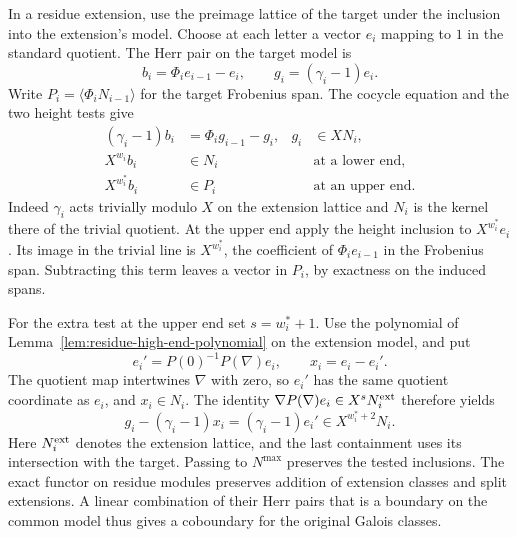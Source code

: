 In a residue extension, use the preimage lattice of the target
under the inclusion into the extension's model. Choose at each
letter a vector \(e_i\) mapping to \(1\) in the standard quotient.
The Herr pair on the target model is
\[
 b_i=\Phi_i e_{i-1}-e_i,\qquad g_i=(\gamma_i-1)e_i.
\]
Write \(P_i=\langle\Phi_i N_{i-1}\rangle\) for the target
Frobenius span. The cocycle equation and the two height tests
give
\[
 \begin{aligned}
 (\gamma_i-1)b_i&=\Phi_i g_{i-1}-g_i, &g_i&\in XN_i,\\
 X^{w_i}b_i&\in N_i &&\text{at a lower end},\\
 X^{w_i^*}b_i&\in P_i &&\text{at an upper end}.
 \end{aligned}
\]
Indeed \(\gamma_i\) acts trivially modulo \(X\) on the extension
lattice and \(N_i\) is the kernel there of the trivial quotient.
At the upper end apply the height inclusion to \(X^{w_i^*}e_i\).
Its image in the trivial line is \(X^{w_i^*}\), the coefficient
of \(\Phi_i e_{i-1}\) in the Frobenius span. Subtracting this
term leaves a vector in \(P_i\), by exactness on the induced
spans.

For the extra test at the upper end set \(s=w_i^*+1\).
Use the polynomial of Lemma~\ref{lem:residue-high-end-polynomial}
on the extension model, and put
\[
    e_i'=P(0)^{-1}P(\nabla)e_i,\qquad x_i=e_i-e_i'.
\]
The quotient map intertwines \(\nabla\) with zero, so \(e_i'\)
has the same quotient coordinate as \(e_i\), and \(x_i\in N_i\).
The identity \(\nabla P(\nabla)e_i\in X^s N_i^{\rm ext}\)
therefore yields
\[
     g_i-(\gamma_i-1)x_i=(\gamma_i-1)e_i'
                          \in X^{w_i^*+2}N_i .
\]
Here \(N_i^{\rm ext}\) denotes the extension lattice, and the
last containment uses its intersection with the target. Passing
to \(N^{\max}\) preserves the tested inclusions.
The exact functor on residue modules preserves addition of
extension classes and split extensions. A linear combination of
their Herr pairs that is a boundary on the common model thus
gives a coboundary for the original Galois classes.
\label{cor:residue-model-length-2}

